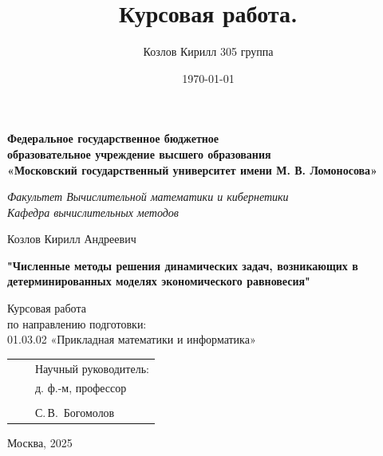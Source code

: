\documentclass[a4paper,12pt]{article}
\title{Курсовая работа.}
\author{Козлов Кирилл 305 группа}
\date{\today}
\begin{document}
\thispagestyle{empty}
\begin{center}
\textbf{Федеральное государственное бюджетное\\
образовательное учреждение высшего образования\\
«Московский государственный университет имени М. В. Ломоносова»}

\vspace{0.5em}
\textit{Факультет Вычислительной математики и кибернетики \\}
\textit{Кафедра вычислительных методов}

\vspace{3em}
Козлов Кирилл Андреевич

\vspace{2em}
\textbf{\LARGE "Численные методы решения динамических задач, возникающих в детерминированных моделях экономического равновесия"}

\vspace{2em}
Курсовая работа\\
по направлению подготовки:\\ 
01.03.02 «Прикладная математики и информатика»\\
\end{center}

\vspace{25em}
\begin{tabular}{p{5cm}p{5cm}p{5cm}}
     & & Научный руководитель: \\
     & & д. ф.-м, профессор \\
    \noalign{\vspace{3em}}
     & & \underline{\hspace{5cm}} \\
     & & С.\,В.~Богомолов \\
\end{tabular}

\vfill
\begin{center}
Москва, 2025
\end{center}
\newpage

\tableofcontents

\newpage
\end{document}
